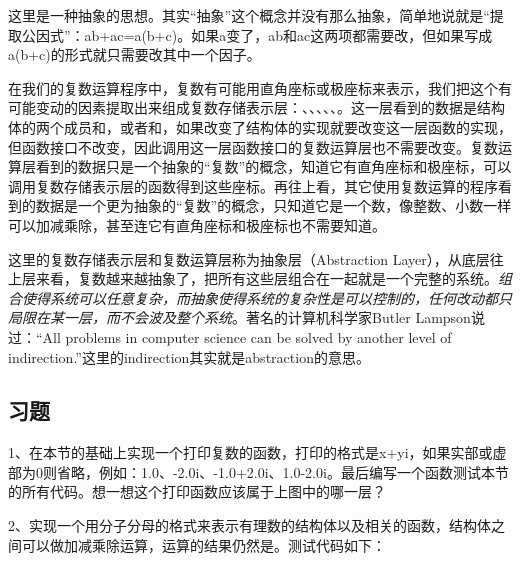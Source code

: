 

这里是一种抽象的思想。其实“抽象”这个概念并没有那么抽象，简单地说就是“提取公因式”：ab+\BookSplit{}ac=\BookSplit{}a(b+\BookSplit{}c)。如果a变了，ab和ac这两项都需要改，但如果写成a(b+\BookSplit{}c)的形式就只需要改其中一个因子。



在我们的复数运算程序中，复数有可能用直角座标或极座标来表示，我们把这个有可能变动的因素提取出来组成复数存储表示层：、、、、、。这一层看到的数据是结构体的两个成员和，或者和，如果改变了结构体的实现就要改变这一层函数的实现，但函数接口不改变，因此调用这一层函数接口的复数运算层也不需要改变。复数运算层看到的数据只是一个抽象的“复数”的概念，知道它有直角座标和极座标，可以调用复数存储表示层的函数得到这些座标。再往上看，其它使用复数运算的程序看到的数据是一个更为抽象的“复数”的概念，只知道它是一个数，像整数、小数一样可以加减乘除，甚至连它有直角座标和极座标也不需要知道。



这里的复数存储表示层和复数运算层称为抽象层（Abstraction Layer），从底层往上层来看，复数越来越抽象了，把所有这些层组合在一起就是一个完整的系统。\emph{组合使得系统可以任意复杂，而抽象使得系统的复杂性是可以控制的，任何改动都只局限在某一层，而不会波及整个系统}。著名的计算机科学家Butler Lampson说过：“All problems in computer science can be solved by another level of indirection.\BookSplit{}”这里的indirection其实就是abstraction的意思。


\subsection*{习题}
%


1、在本节的基础上实现一个打印复数的函数，打印的格式是x+\BookSplit{}yi，如果实部或虚部为0则省略，例如：1.\BookSplit{}0、-2.\BookSplit{}0i、-1.\BookSplit{}0+\BookSplit{}2.\BookSplit{}0i、1.\BookSplit{}0-2.\BookSplit{}0i。最后编写一个函数测试本节的所有代码。想一想这个打印函数应该属于上图中的哪一层？



2、实现一个用分子分母的格式来表示有理数的结构体以及相关的函数，结构体之间可以做加减乘除运算，运算的结果仍然是。测试代码如下：


